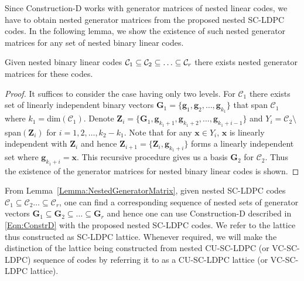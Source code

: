 Since Construction-D works with generator matrices of nested linear codes, we have to obtain nested generator matrices from the proposed nested SC-LDPC codes. In the following lemma, we show the existence of such nested generator matrices for any set of nested binary linear codes.
\begin{lemma}\label{Lemma:NestedGeneratorMatrix}
    Given nested binary linear codes $\mathcal{C}_{1}\subseteq \mathcal{C}_{2}\subseteq\ldots \subseteq\mathcal{C}_{r}$ there exists nested generator matrices for these codes.
\end{lemma}
\begin{proof}
It suffices to consider the case having only two levels. For $\mathcal{C}_{1}$ there exists set of linearly independent binary vectors
$\mathbf{G}_{1}=\{\mathbf{g}_1,\mathbf{g}_2,\ldots, \mathbf{g}_{k_1}\}$ that span $\mathcal{C}_{1}$ where $k_{1}=$dim$(\mathcal{C}_{1})$.
Denote $\mathbf{Z}_{i}=\{\mathbf{G}_{1},\mathbf{g}_{k_{1}+1},\mathbf{g}_{k_{1}+2}, \ldots, \mathbf{g}_{k_{1}+i-1}\}$ and $Y_{i}=\mathcal{C}_{2}\setminus$
span$(\mathbf{Z}_{i})$ for $i=1,2, \ldots, k_{2}-k_{1}$. Note that for any $\mathbf{x}\in Y_{i}$, $\mathbf{x}$ is linearly independent with $\mathbf{Z}_{i}$ and hence
$\mathbf{Z}_{i+1}=\{\mathbf{Z}_{i},\mathbf{g}_{k_{1}+i}\}$ forms a linearly independent set where $\mathbf{g}_{k_{1}+i}=\mathbf{x}$. This recursive procedure gives us a basis $\mathbf{G}_{2}$ for $\mathcal{C}_{2}$. Thus the existence of the generator matrices for nested binary linear codes is shown.
\end{proof}
From Lemma~\ref{Lemma:NestedGeneratorMatrix}, given nested SC-LDPC codes $\mathcal{C}_{1}\subseteq \mathcal{C}_{2}\ldots \subseteq\mathcal{C}_{r}$, one can find a corresponding sequence of nested sets of generator vectors $\mathbf{G}_{1}\subseteq \mathbf{G}_{2} \subseteq \ldots \subseteq\mathbf{G}_{r}$ and hence one can use Construction-D described in \eqref{Eqn:ConstrD} with the proposed nested SC-LDPC codes. We refer to the lattice thus constructed as SC-LDPC lattice. Whenever required, we will make the distinction of the lattice being constructed from nested CU-SC-LDPC (or VC-SC-LDPC) sequence of codes by referring it to as a CU-SC-LDPC lattice (or VC-SC-LDPC lattice). 

